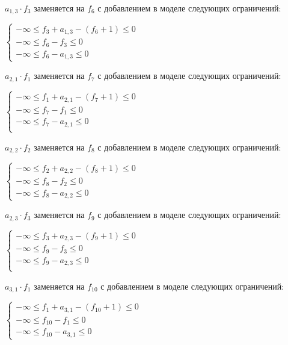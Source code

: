 \begin{enumerate}
  $a_{1, 3} \cdot f_{3}$ заменяется на $f_{6}$ с добавлением в моделе следующих ограничений:
  \begin{center}
    $
      \begin{cases}
        -\infty \le f_{3} + a_{1,3} - (f_{6} + 1) \le 0 \\ %
        -\infty \le f_{6} - f_{3} \le 0 \\ %
        -\infty \le f_{6} - a_{1,3} \le 0 %
      \end{cases}
    $
  \end{center}

  $a_{2, 1} \cdot f_{1}$ заменяется на $f_{7}$ с добавлением в моделе следующих ограничений:
  \begin{center}
    $
      \begin{cases}
        -\infty \le f_{1} + a_{2,1} - (f_{7} + 1) \le 0 \\ %
        -\infty \le f_{7} - f_{1} \le 0 \\ %
        -\infty \le f_{7} - a_{2,1} \le 0 \\ %
      \end{cases}
    $
  \end{center}

  $a_{2, 2} \cdot f_{2}$ заменяется на $f_{8}$ с добавлением в моделе следующих ограничений:
  \begin{center}
    $
      \begin{cases}
        -\infty \le f_{2} + a_{2,2} - (f_{8} + 1) \le 0 \\ %
        -\infty \le f_{8} - f_{2} \le 0 \\ %
        -\infty \le f_{8} - a_{2,2} \le 0 %
      \end{cases}
    $
  \end{center}

  $a_{2, 3} \cdot f_{3}$ заменяется на $f_{9}$ с добавлением в моделе следующих ограничений:
  \begin{center}
    $
      \begin{cases}
        -\infty \le f_{3} + a_{2,3} - (f_{9} + 1) \le 0 \\ %
        -\infty \le f_{9} - f_{3} \le 0 \\ %
        -\infty \le f_{9} - a_{2,3} \le 0 \\ %
      \end{cases}
    $
  \end{center}

  $a_{3, 1} \cdot f_{1}$ заменяется на $f_{10}$ с добавлением в моделе следующих ограничений:
  \begin{center}
    $
      \begin{cases}
        -\infty \le f_{1} + a_{3,1} - (f_{10} + 1) \le 0 \\ %
        -\infty \le f_{10} - f_{1} \le 0 \\ %
        -\infty \le f_{10} - a_{3,1} \le 0 %
      \end{cases}
    $
  \end{center}


\end{enumerate}

